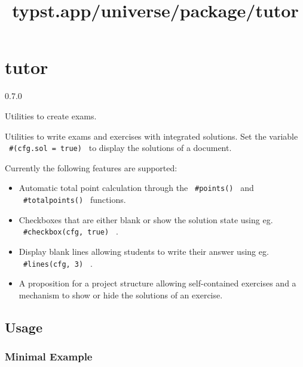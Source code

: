 \title{typst.app/universe/package/tutor}

\label{banner}
\section{tutor}\label{tutor}

{ 0.7.0 }

Utilities to create exams.

\label{readme}
Utilities to write exams and exercises with integrated solutions. Set
the variable \texttt{\ \#(cfg.sol\ =\ true)\ } to display the solutions
of a document.

Currently the following features are supported:

\begin{itemize}
\tightlist
\item
  Automatic total point calculation through the \texttt{\ \#points()\ }
  and \texttt{\ \#totalpoints()\ } functions.
\item
  Checkboxes that are either blank or show the solution state using eg.
  \texttt{\ \#checkbox(cfg,\ true)\ } .
\item
  Display blank lines allowing students to write their answer using eg.
  \texttt{\ \#lines(cfg,\ 3)\ } .
\item
  A proposition for a project structure allowing self-contained
  exercises and a mechanism to show or hide the solutions of an
  exercise.
\end{itemize}

\subsection{Usage}\label{usage}

\subsubsection{Minimal Example}\label{minimal-example}

\begin{Shaded}
\begin{Highlighting}[]



\end{Highlighting}
\end{Shaded}

